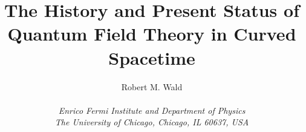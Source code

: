 
\topmargin -10mm  
\setlength{\textheight}{22.5cm}
\setlength{\textwidth}{16cm}


\def\ben{\begin{equation}} 
\def\een{\end{equation}}
\def\bena{\begin{eqnarray}} 
\def\eena{\end{eqnarray}}
\def\f(#1/#2){\frac{#1}{#2}} 
\def\Frac(#1/#2){\left(\frac{#1}{#2}\right)}
\def\scalar{{\Bbb S}} 
\def\vector{{\Bbb V}} 
\def\tensor{{\Bbb T}} 

\def\Dphi{{\mit \Delta}\phi}

\def\half{{1\over 2}}
\def\quater{{1 \over 4}} 
\def\ord#1{{}^{(#1)}\!}

\def\Tdot#1{{{#1}^{\hbox{.}}}}
\def\Tddot#1{{{#1}^{\hbox{..}}}}
\def\Tdddot#1{{{#1}^{\hbox{...}}}}
\def\dddot#1{\stackrel{...}{#1}{}\!\!}

\def\dt{{\bar \delta {t}}} 

\newcommand{\la}{\langle}
\newcommand{\ra}{\rangle}

\newcommand{\A}{{\mathscr A}} 
\newcommand{\B}{{\mathscr B}} 
\newcommand{\D}{{\mathcal D}} 
\newcommand{\OD}{\widehat \nabla} 
\newcommand{\F}{{\mathscr F}} 
\newcommand{\K}{{\mathscr K}} 
\newcommand{\R}{{\mathscr R}} 
\newcommand{\re}{{\rm Re}} 
\newcommand{\im}{{\rm Im}} 
\newcommand{\vs}{\vspace*{5mm}}  
\newcommand{\non}{\nonumber}    


 

\title{ The History and Present Status of Quantum Field Theory in Curved
Spacetime}  

\author{Robert M. Wald \\ \\  
 {\it Enrico Fermi Institute and Department of Physics}\\  
 {\it The University of Chicago, Chicago, IL 60637, USA} 
        } %


\maketitle

